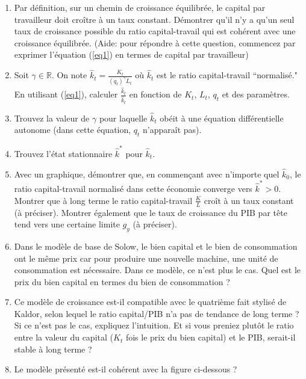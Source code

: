 \documentclass{article}
\begin{document}
\begin{enumerate}
\item Par définition, sur un chemin de croissance équilibrée, le capital par travailleur doit croître à un taux constant.  Démontrer qu'il n'y a qu'un seul taux de croissance possible du ratio capital-travail qui est cohérent avec une croissance équilibrée. (Aide: pour répondre à cette question, commencez par exprimer l'équation (\ref{eq1}) en termes de capital par travailleur)

\item Soit \( \gamma \in \mathbb{R} \). On note  \( \hat{k}_t = \frac{K_t}{(q_t)^{\gamma} L_t} \) où $\hat{k}_t$ est le ratio capital-travail “normalisé." En utilisant (\ref{eq1}), calculer \( \frac{\dot{\hat{k}}_t}{\hat{k}_t} \) en fonction de \( K_t \), \( L_t \), \( q_t \) et des paramètres.

 \item Trouvez la valeur de \( \gamma \) pour laquelle \( \hat{k}_t \) obéit à une équation différentielle autonome (dans cette équation, 
$q_t$ n'apparaît pas).   \item Trouvez l'état stationnaire $\hat{k}^{\ast}$ pour \( \hat{k}_t \).  \item Avec un graphique, démontrer que, en commençant avec n'importe quel \( \hat{k}_0 \), le ratio capital-travail normalisé dans cette économie converge vers \( \hat{k}^{\ast}>0 \). Montrer que à long terme le ratio capital-travail \( \frac{K}{L} \) croît à un taux constant (à préciser). Montrer également que le taux de croissance du PIB par tête tend vers une certaine limite \( g_y \) (à préciser).


 \item Dans le modèle de base de Solow, le bien capital et le bien de consommation ont le même prix car pour produire une nouvelle machine, une unité de consommation est nécessaire. Dans ce modèle, ce n'est plus le cas. Quel est le prix du bien capital en termes du bien de consommation ? 
    \item Ce modèle de croissance est-il compatible avec le quatrième fait stylisé de Kaldor, selon lequel le ratio capital/PIB n’a pas de tendance de long terme ? Si ce n'est pas le cas, expliquez l'intuition. Et si vous preniez plutôt le ratio entre la valeur du capital ($K_t$ fois le prix du bien capital) et le PIB, serait-il stable à long terme ?
\item Le modèle présenté est-il cohérent avec la figure ci-dessous ?
\bigskip 


\end{enumerate}
\end{document}
